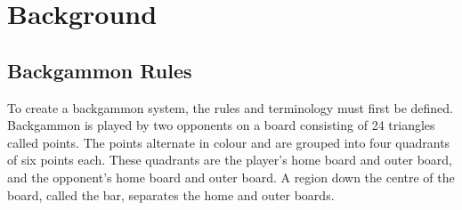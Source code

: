 
\chapter{Background}
\section{Backgammon Rules}
To create a backgammon system, the rules and terminology must first be defined.
Backgammon is played by two opponents on a board consisting of 24 triangles called points. 
The points alternate in colour and are grouped into four quadrants of six points each.
These quadrants are the player's home board and outer board, and the opponent's home board and outer board. 
A region down the centre of the board, called the bar, separates the home and outer boards.

